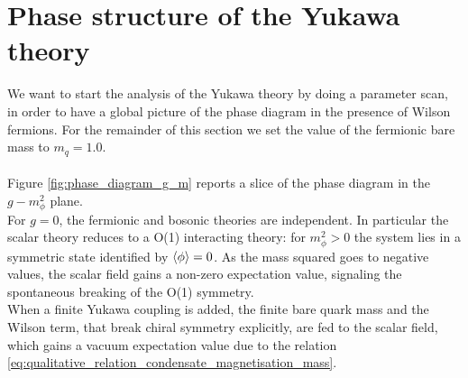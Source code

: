 \newpage

\section{Phase structure of the Yukawa theory}
We want to start the analysis of the Yukawa theory by doing a parameter scan, in order to have a global picture of the phase diagram in the presence of Wilson fermions. For the remainder of this section we set the value of the fermionic bare mass to $m_q = 1.0$.\\~\\
Figure \ref{fig:phase_diagram_g_m} reports a slice of the phase diagram in the $g-m_\phi^2$ plane. \\
For $g=0$, the fermionic and bosonic theories are independent. In particular the scalar theory reduces to a O(1) interacting theory: for $m_\phi^2>0$ the system lies in a symmetric state identified by $\left\langle \phi \right\rangle = 0$. 
As the mass squared goes to negative values, the scalar field gains a non-zero expectation value, signaling the spontaneous breaking of the O(1) symmetry. \\
When a finite Yukawa coupling is added, the finite bare quark mass and the Wilson term, that break chiral symmetry explicitly, are fed to the scalar field, which gains a vacuum expectation value due to the relation \eqref{eq:qualitative_relation_condensate_magnetisation_mass}.
